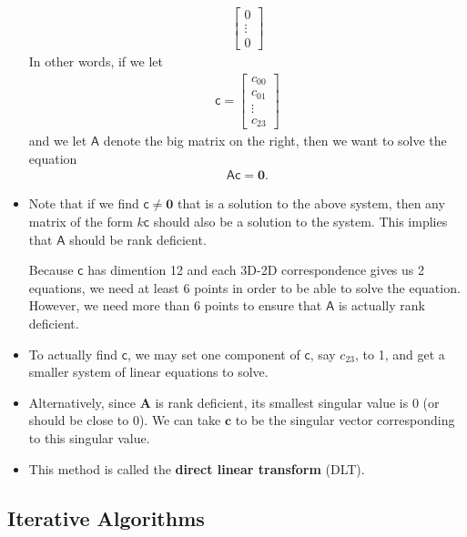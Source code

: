 \documentclass[10pt]{article}
\newcommand{\ve}[1]{\mathbf{#1}}
\newcommand{\msf}[1]{\mathsf{#1}}
\begin{document}
\begin{itemize}
\begin{align*}
\begin{bmatrix}
          0\\
          \vdots\\
          0          
        \end{bmatrix}        
      \end{align*}
      In other words, if we let 
      \begin{align*}
        \msf{c} = \begin{bmatrix}
          c_{00} \\
          c_{01} \\
          \vdots \\
          c_{23}
        \end{bmatrix}
      \end{align*}
      and we let $\msf{A}$ denote the big matrix on the right, then we want to solve the equation
      \begin{align*}
        \msf{A} \msf{c} = \ve{0}.
      \end{align*}
      
    \item Note that if we find $\msf{c} \neq \ve{0}$ that is a solution to the above system, then any
      matrix of the form $k\msf{c}$ should also be a solution to the system. This implies that $\msf{A}$ should be rank deficient. 
                
      Because $\msf{c}$ has dimention 12 and each 3D-2D correspondence gives us 2 equations,
      we need at least 6 points in order to be able to solve the equation. However, we need more
      than $6$ points to ensure that $\msf{A}$ is actually rank deficient.
      
    \item To actually find $\msf{c}$, we may set one component of $\msf{c}$, say $c_{23}$, to 1, and get a smaller
      system of linear equations to solve. 
      
    \item Alternatively, since $\ve{A}$ is rank deficient, its smallest singular value is 0 (or should be close to 0).
      We can take $\ve{c}$ to be the singular vector corresponding to this singular value.
      
    \item This method is called the {\bf direct linear transform} (DLT).    
  \end{itemize}
  
  \subsection{Iterative Algorithms}
  
\end{document}
